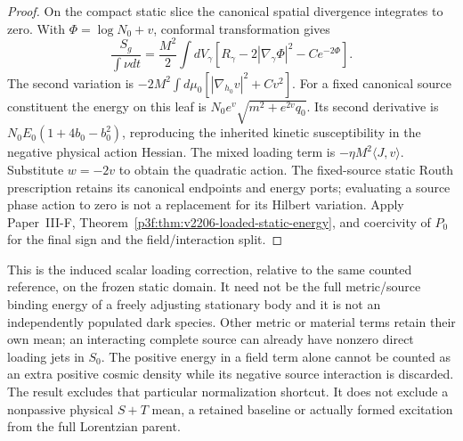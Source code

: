 \documentclass[12pt,a4paper]{article}
\begin{document}
\begin{proof}
On the compact static slice the canonical spatial divergence integrates
to zero. With $\Phi=\log N_0+v$, conformal transformation gives
\[
 \frac{S_g}{\int\nu dt}
 =\frac{M^2}{2}\int dV_\gamma
       [R_\gamma-2|\nabla_\gamma\Phi|^2-Ce^{-2\Phi}].
\]
The second variation is
$-2M^2\int d\mu_0[|\nabla_{h_0}v|^2+Cv^2]$.
For a fixed canonical source constituent the energy on this leaf is
$N_0e^v\sqrt{m^2+e^{2v}q_0}$. Its second derivative is
$N_0E_0(1+4b_0-b_0^2)$, reproducing the inherited kinetic
susceptibility in the negative physical action Hessian. The mixed loading
term is $-\eta M^2\langle J,v\rangle$.
Substitute $w=-2v$ to obtain the quadratic action. The fixed-source static
Routh prescription retains its canonical endpoints and energy ports;
evaluating a source phase action to zero is not a replacement for its
Hilbert variation. Apply Paper~III-F,
Theorem~\ref{p3f:thm:v2206-loaded-static-energy}, and coercivity of $P_0$
for the final sign and the field/interaction split.
\end{proof}

\begin{remark}
\label{p8:rem:v2206-static-sign-scope}
This is the induced scalar loading correction, relative to the same
counted reference, on the frozen static domain. It need not be the full
metric/source binding energy of a freely adjusting stationary body and
it is not an independently populated dark species. Other metric or
material terms retain their own mean; an interacting complete source
can already have nonzero direct loading jets in $S_0$.
The positive energy in a field term alone cannot be counted as an extra
positive cosmic density while its negative source interaction is discarded.
The result excludes that particular normalization shortcut. It does not
exclude a nonpassive physical $S+T$ mean, a retained baseline or actually
formed excitation from the full Lorentzian parent.
\end{remark}

\end{document}
